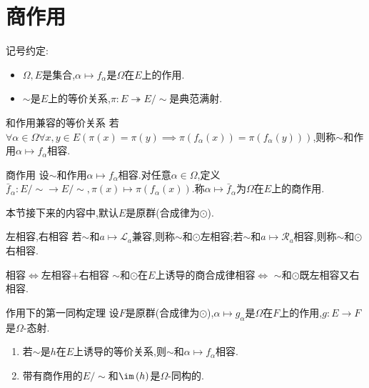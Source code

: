 \section{商作用}

记号约定:
\begin{itemize}
	\item $\Omega,E$是集合,$\alpha\mapsto f_{\alpha}$是$\Omega$在$E$上的作用.
	\item $\sim$是$E$上的等价关系,$\pi:E\twoheadrightarrow E/\sim$是典范满射.
\end{itemize}

\begin{definition}{和作用兼容的等价关系}{}
	若$\forall\alpha\in\Omega\forall x,y\in E\left(\pi\left(x\right)=\pi\left(y\right)\implies\pi\left(f_{\alpha}\left(x\right)\right)=\pi\left(f_{\alpha}\left(y\right)\right)\right)$,则称$\sim$和作用$\alpha\mapsto f_{\alpha}$相容.
\end{definition}

\begin{definition}{商作用}{}
	设$\sim$和作用$\alpha\mapsto f_{\alpha}$相容.对任意$\alpha\in\Omega$,定义$\bar{f}_{\alpha}:E/\sim\to E/\sim,\pi\left(x\right)\mapsto\pi\left(f_{\alpha}\left(x\right)\right)$.称$\alpha\mapsto\bar{f}_{\alpha}$为$\Omega$在$E$上的商作用.
\end{definition}

本节接下来的内容中,默认$E$是原群(合成律为$\odot$).

\begin{definition}{左相容,右相容}{}
	若$\sim$和$a\mapsto\mathcal{L}_{a}$兼容,则称$\sim$和$\odot$左相容;若$\sim$和$a\mapsto\mathcal{R}_{a}$相容,则称$\sim$和$\odot$右相容.
\end{definition}

\begin{theorem}{相容$\iff$左相容+右相容}{}
	$\sim$和$\odot$在$E$上诱导的商合成律相容$\iff$ $\sim$和$\odot$既左相容又右相容.
\end{theorem}

\begin{theorem}{作用下的第一同构定理}{}
	设$F$是原群(合成律为$\odot$),$\alpha\mapsto g_{\alpha}$是$\Omega$在$F$上的作用,$g:E\to F$是$\Omega$-态射.
	\begin{enumerate}
		\item 若$\sim$是$h$在$E$上诱导的等价关系,则$\sim$和$\alpha\mapsto f_{\alpha}$相容.
		\item 带有商作用的$E/\sim$和$\im\left(h\right)$是$\Omega$-同构的.
	\end{enumerate}
\end{theorem}

